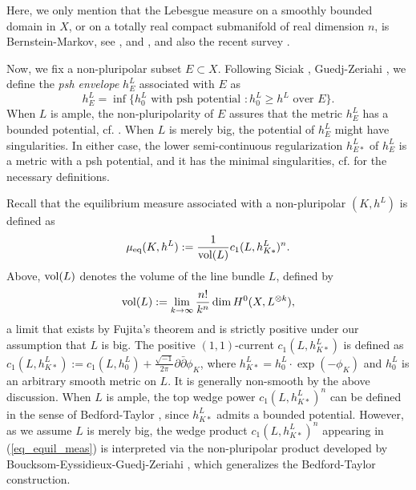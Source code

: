 \documentclass[12pt]{article}
\numberwithin{equation}{section}
\theoremstyle{theorem}
\theoremstyle{definition}
\theoremstyle{remark}
\newcommand{\imun} {\sqrt{-1}}
\begin{document}
	Here, we only mention that the Lebesgue measure on a smoothly bounded domain in $X$, or on a totally real compact submanifold of real dimension $n$, is Bernstein-Markov, see \cite[Corollary 1.8]{BerBoucNys}, \cite[Proposition 3.6]{BernsteinMarkovSurvey} and \cite[Theorem 1.3]{MarinescuVu}, and also the recent survey \cite{MarinescuVuSurvey}.
	\par 
	Now, we fix a non-pluripolar subset $E \subset X$. 
	Following Siciak \cite{SiciakExtremal}, Guedj-Zeriahi \cite{GuedZeriGeomAnal}, we define the \textit{psh envelope} $h^L_{E}$ associated with $E$ as
	\begin{equation}\label{defn_env}
		h^L_E
		=
		\inf \Big\{
			h^L_0 \text{ with psh potential }: h^L_0 \geq h^L \text{ over } E
		\Big\}.
	\end{equation}
	When $L$ is ample, the non-pluripolarity of $E$ assures that the metric $h^L_E$ has a bounded potential, cf. \cite[Theorem 9.17]{GuedZeriGeomAnal}.
	When $L$ is merely big, the potential of $h^L_E$ might have singularities.
	In either case, the lower semi-continuous regularization $h^L_{E *}$ of $h^L_E$ is a metric with a psh potential, and it has the minimal singularities, cf. \cite[\S 1.2]{BermanBouckBalls} for the necessary definitions.
	\par 
	Recall that the equilibrium measure associated with a non-pluripolar $(K, h^L)$ is defined as
	\begin{equation}\label{eq_equil_meas}
		\mu_{\mathrm{eq}}(K, h^L) := \frac{1}{{\rm{vol}}(L)} c_1(L, h^L_{K *})^n.
	\end{equation}
	Above, ${\rm vol}(L)$ denotes the volume of the line bundle $L$, defined by
	\begin{equation}
		{\rm{vol}}(L) := \lim_{k \to \infty} \frac{n!}{k^n} \dim H^0(X, L^{\otimes k}),
	\end{equation}
	a limit that exists by Fujita’s theorem \cite{Fujita} and is strictly positive under our assumption that $L$ is big. 
	The positive $(1,1)$-current $c_1(L, h^L_{K *})$ is defined as $ c_1(L, h^L_{K *}) := c_1(L, h^L_0) + \frac{\imun}{2 \pi} \partial \bar{\partial} \phi_K$, where $h^L_{K *} = h^L_0 \cdot \exp(-\phi_K)$ and $h^L_0$ is an arbitrary smooth metric on $L$. 
	It is generally non-smooth by the above discussion.
	When $L$ is ample, the top wedge power $c_1(L, h^L_{K*})^n$ can be defined in the sense of Bedford-Taylor \cite{BedfordTaylor}, since $h^L_{K*}$ admits a bounded potential. 
	However, as we assume $L$ is merely big, the wedge product $c_1(L, h^L_{K*})^n$ appearing in (\ref{eq_equil_meas}) is interpreted via the non-pluripolar product developed by Boucksom-Eyssidieux-Guedj-Zeriahi \cite{BEGZ}, which generalizes the Bedford-Taylor construction. 
\end{document}
